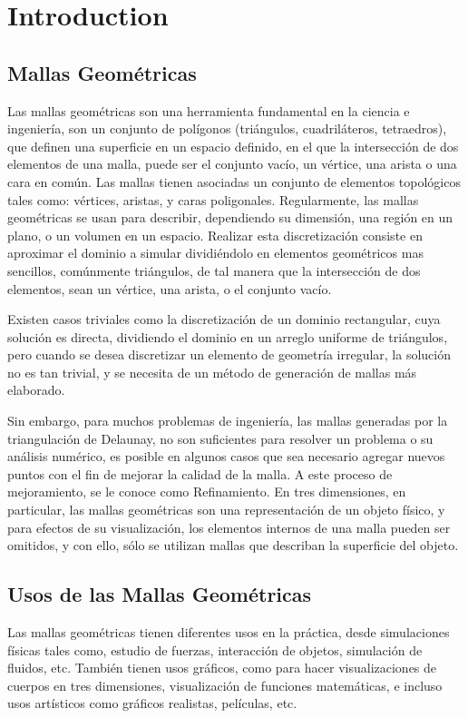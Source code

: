 \chapter{Introduction}
\label{ch:introduction}

\section{Mallas Geométricas}
\label{sec:mallasGeometricas}
Las mallas geométricas son una herramienta fundamental en la ciencia e ingeniería, son 
un conjunto de polígonos (triángulos, cuadriláteros, tetraedros), que definen una superficie en un 
espacio definido, en el que la intersección de dos elementos de una malla, puede ser el conjunto 
vacío, un vértice, una arista o una cara en común. Las mallas tienen asociadas un conjunto de 
elementos topológicos tales como: vértices, aristas, y caras poligonales.
Regularmente, las mallas geométricas se usan para describir, dependiendo su dimensión, 
una región en un plano, o un volumen en un espacio. Realizar esta discretización consiste en 
aproximar el dominio a simular dividiéndolo en elementos geométricos mas sencillos, 
comúnmente triángulos, de tal manera que la intersección de dos elementos, sean un vértice, una 
arista, o el conjunto vacío.

Existen casos triviales como la discretización de un dominio rectangular, cuya solución es 
directa, dividiendo el dominio en un arreglo uniforme de triángulos, pero cuando se desea 
discretizar un elemento de geometría irregular, la solución no es tan trivial, y se necesita de un 
método de generación de mallas más elaborado.

Sin embargo, para muchos problemas de ingeniería, las mallas generadas por la 
triangulación de Delaunay, no son suficientes para resolver un problema o su análisis numérico, 
es posible en algunos casos que sea necesario agregar nuevos puntos con el fin de mejorar la 
calidad de la malla. A este proceso de mejoramiento, se le conoce como Refinamiento.
En tres dimensiones, en particular, las mallas geométricas son una representación de un 
objeto físico, y para efectos de su visualización, los elementos internos de una malla pueden ser 
omitidos, y con ello, sólo se utilizan mallas que describan la superficie del objeto.

\section{Usos de las Mallas Geométricas}
\label{sec:usosDeLasMallasGeometricas}
Las mallas geométricas tienen diferentes usos en la práctica, desde simulaciones físicas 
tales como, estudio de fuerzas, interacción de objetos, simulación de fluidos, etc. También tienen 
usos gráficos, como para hacer visualizaciones de cuerpos en tres dimensiones, visualización de 
funciones matemáticas, e incluso usos artísticos como gráficos realistas, películas, etc.


